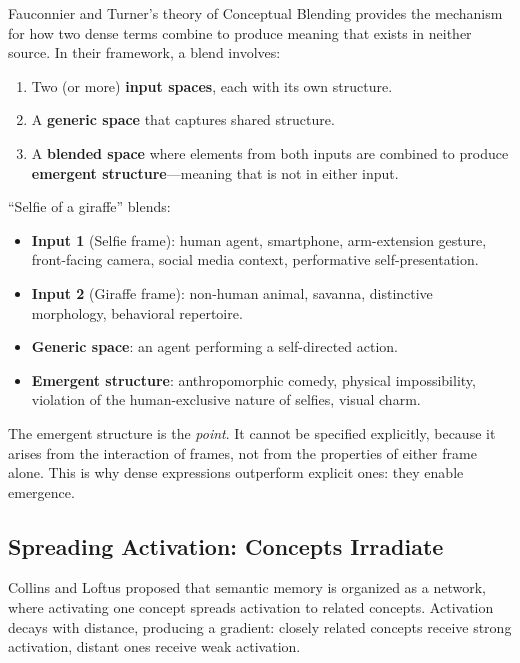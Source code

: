 \documentclass[12pt,a4paper]{article}
\begin{document}
Fauconnier and Turner's theory of Conceptual Blending \cite{fauconnier2002} provides the mechanism for how two dense terms combine to produce meaning that exists in neither source.
In their framework, a blend involves:

\begin{enumerate}
  \item Two (or more) \textbf{input spaces}, each with its own structure.
  \item A \textbf{generic space} that captures shared structure.
  \item A \textbf{blended space} where elements from both inputs are combined to produce \textbf{emergent structure}---meaning that is not in either input.
\end{enumerate}

``Selfie of a giraffe'' blends:
\begin{itemize}
  \item \textbf{Input 1} (Selfie frame): human agent, smartphone, arm-extension gesture, front-facing camera, social media context, performative self-presentation.
  \item \textbf{Input 2} (Giraffe frame): non-human animal, savanna, distinctive morphology, behavioral repertoire.
  \item \textbf{Generic space}: an agent performing a self-directed action.
  \item \textbf{Emergent structure}: anthropomorphic comedy, physical impossibility, violation of the human-exclusive nature of selfies, visual charm.
\end{itemize}

The emergent structure is the \textit{point}.
It cannot be specified explicitly, because it arises from the interaction of frames, not from the properties of either frame alone.
This is why dense expressions outperform explicit ones: they enable emergence.

\subsection{Spreading Activation: Concepts Irradiate}
\label{subsec:spreading}

Collins and Loftus \cite{collins1975} proposed that semantic memory is organized as a network, where activating one concept spreads activation to related concepts.
Activation decays with distance, producing a gradient: closely related concepts receive strong activation, distant ones receive weak activation.
\end{document}
